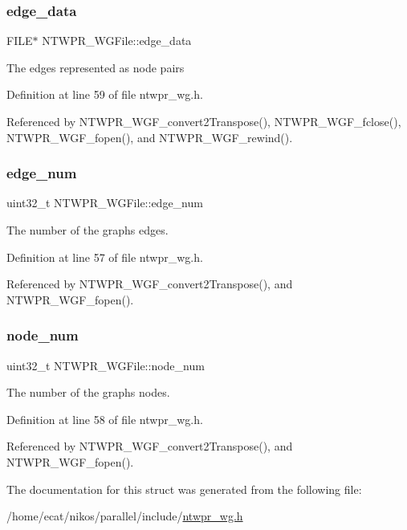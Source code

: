 \subsubsection{\texorpdfstring{edge\+\_\+data}{edge\_data}}
{\footnotesize\ttfamily F\+I\+LE$\ast$ N\+T\+W\+P\+R\+\_\+\+W\+G\+File\+::edge\+\_\+data}

The edges represented as node pairs 

Definition at line 59 of file ntwpr\+\_\+wg.\+h.



Referenced by N\+T\+W\+P\+R\+\_\+\+W\+G\+F\+\_\+convert2\+Transpose(), N\+T\+W\+P\+R\+\_\+\+W\+G\+F\+\_\+fclose(), N\+T\+W\+P\+R\+\_\+\+W\+G\+F\+\_\+fopen(), and N\+T\+W\+P\+R\+\_\+\+W\+G\+F\+\_\+rewind().

\mbox{\label{structNTWPR__WGFile_a76b00f9ef8cd1938f7b9ece2db7c686d}} 
\subsubsection{\texorpdfstring{edge\+\_\+num}{edge\_num}}
{\footnotesize\ttfamily uint32\+\_\+t N\+T\+W\+P\+R\+\_\+\+W\+G\+File\+::edge\+\_\+num}

The number of the graph\textquotesingle{}s edges. 

Definition at line 57 of file ntwpr\+\_\+wg.\+h.



Referenced by N\+T\+W\+P\+R\+\_\+\+W\+G\+F\+\_\+convert2\+Transpose(), and N\+T\+W\+P\+R\+\_\+\+W\+G\+F\+\_\+fopen().

\mbox{\label{structNTWPR__WGFile_a473237730653419df2494e0f2f52995c}} 
\subsubsection{\texorpdfstring{node\+\_\+num}{node\_num}}
{\footnotesize\ttfamily uint32\+\_\+t N\+T\+W\+P\+R\+\_\+\+W\+G\+File\+::node\+\_\+num}

The number of the graph\textquotesingle{}s nodes. 

Definition at line 58 of file ntwpr\+\_\+wg.\+h.



Referenced by N\+T\+W\+P\+R\+\_\+\+W\+G\+F\+\_\+convert2\+Transpose(), and N\+T\+W\+P\+R\+\_\+\+W\+G\+F\+\_\+fopen().



The documentation for this struct was generated from the following file\+:\begin{DoxyCompactItemize}
\item 
/home/ecat/nikos/parallel/include/\mbox{\hyperlink{ntwpr__wg_8h}{ntwpr\+\_\+wg.\+h}}\end{DoxyCompactItemize}
